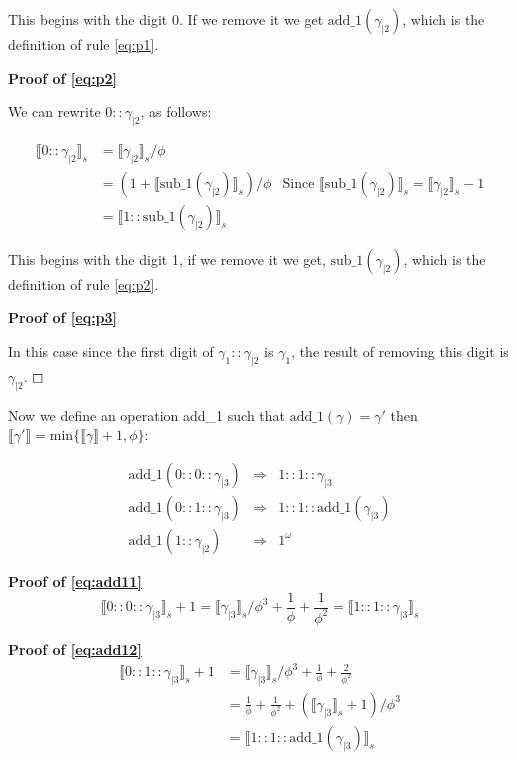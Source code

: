 \documentclass{cs4rep}
\begin{document}
This begins with the digit 0. If we remove it we get
$\mbox{add\_1}(\gamma_{|2})$, which is the definition of rule
\ref{eq:p1}.

{\bf Proof of \ref{eq:p2}}

We can rewrite $0::\gamma_{|2}$, as follows:

\[ \begin{array}{lll}
\llbracket 0::\gamma_{|2} \rrbracket_{s} & = \llbracket \gamma_{|2} \rrbracket_{s}/ \phi \\
& = (1+ \llbracket \mbox{sub\_1}(\gamma_{|2}) \rrbracket_{s})/\phi & \mbox{Since } \llbracket \mbox{sub\_1}(\gamma_{|2}) \rrbracket_{s} = \llbracket \gamma_{|2} \rrbracket_{s} - 1 \\
& = \llbracket 1::\mbox{sub\_1}(\gamma_{|2}) \rrbracket_{s}
\end{array} \]

This begins with the digit 1, if we remove it we get,
$\mbox{sub\_1}(\gamma_{|2})$, which is the definition of rule
\ref{eq:p2}.

{\bf Proof of \ref{eq:p3}}

In this case since the first digit of $\gamma_{1}::\gamma_{|2}$ is $\gamma_{1}$, the result of removing this digit is $\gamma_{|2}$.
\hfill $\boxempty$

Now we define an operation add\_1 such that $\mbox{add\_1}(\gamma)=\gamma'$ then $\llbracket \gamma' \rrbracket = \mbox{min}\{\llbracket \gamma \rrbracket + 1, \phi \}$:

\begin{eqnarray}
\mbox{add\_1}(0::0::\gamma_{|3}) & \Rightarrow & 1::1::\gamma_{|3} \label{eq:add11}\\
\mbox{add\_1}(0::1::\gamma_{|3}) & \Rightarrow & 1::1::\mbox{add\_1}(\gamma_{|3}) \label{eq:add12} \\
\mbox{add\_1}(1::\gamma_{|2}) & \Rightarrow & 1^{\omega} \label{eq:add13}
\end{eqnarray}

{\bf Proof of \ref{eq:add11}}
\[ \llbracket 0::0::\gamma_{|3} \rrbracket_{s} + 1 = \llbracket \gamma_{|3} \rrbracket_{s}/\phi^{3} + \frac{1}{\phi} + \frac{1}{\phi^{2}} = \llbracket 1::1::\gamma_{|3} \rrbracket_{s} \]

{\bf Proof of \ref{eq:add12}}
\[ \begin{array}{ll}
\llbracket 0::1::\gamma_{|3} \rrbracket_{s} + 1 & = \llbracket \gamma_{|3} \rrbracket_{s}/\phi^{3} + \frac{1}{\phi} + \frac{2}{\phi^{2}}\\
& = \frac{1}{\phi} + \frac{1}{\phi^{2}} + (\llbracket \gamma_{|3} \rrbracket_{s} + 1)/\phi^{3} \\
& = \llbracket 1::1::\mbox{add\_1}(\gamma_{|3}) \rrbracket_{s}
\end{array} \]
\end{document}
